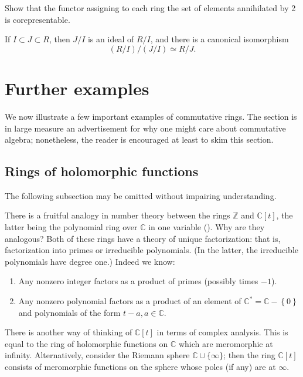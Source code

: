 \begin{exercise} 
Show that the functor assigning to each ring the set of elements annihilated
by 2 is corepresentable. 
\end{exercise} 

\begin{exercise}
If $I \subset J \subset R$, then $J/I$ is an ideal of $R/I$, and there is a
canonical isomorphism
\[ (R/I)/(J/I) \simeq R/J.  \]
\end{exercise} 



\section{Further examples}

We now illustrate a few important examples of 
commutative rings. The section is in large measure an advertisement for why
one might care about commutative algebra; nonetheless, the reader is
encouraged at least to skim this section.

\subsection{Rings of holomorphic functions}

The following subsection may be omitted without impairing understanding.

There is a fruitful analogy in number theory between the rings $\mathbb{Z}$ and
$\mathbb{C}[t]$, the latter being the polynomial ring over $\mathbb{C}$ in one
variable ().  Why are they analogous? Both of these rings have a theory of unique
factorization:  that is, factorization into primes or irreducible polynomials. (In the
latter, the irreducible polynomials have degree one.)
Indeed we know:
\begin{enumerate}
\item Any nonzero integer factors as a product of primes (possibly times $-1$). 
\item Any  nonzero polynomial factors as a product of an element of
$\mathbb{C}^* =\mathbb{C} - \left\{0\right\}$ and polynomials of the form $t -
a, a \in \mathbb{C}$.
\end{enumerate}


There is another way of thinking of $\mathbb{C}[t]$ in terms of complex
analysis.  This is equal to the ring of holomorphic functions on $\mathbb{C}$
which are meromorphic at infinity.  
Alternatively, consider the Riemann sphere $\mathbb{C} \cup \{ \infty\}$; then the ring $\mathbb{C}[t]$
consists of meromorphic functions on the sphere whose poles (if any) are at
$\infty$. 

